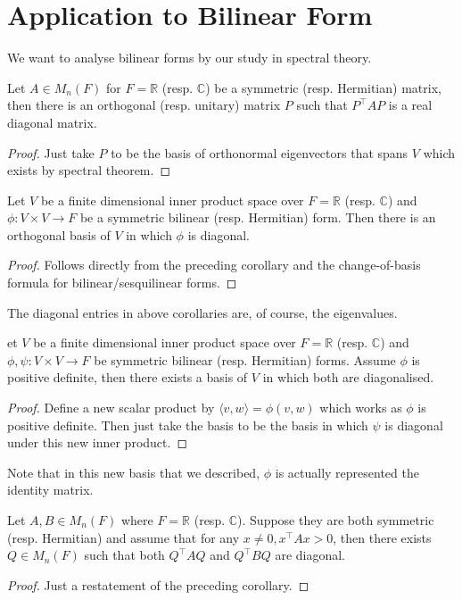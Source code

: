 \section{Application to Bilinear Form}
We want to analyse bilinear forms by our study in spectral theory.
\begin{corollary}
    Let $A\in M_n(F)$ for $F=\mathbb R$ (resp. $\mathbb C$) be a symmetric (resp. Hermitian) matrix, then there is an orthogonal (resp. unitary) matrix $P$ such that $P^\top AP$ is a real diagonal matrix.
\end{corollary}
\begin{proof}
    Just take $P$ to be the basis of orthonormal eigenvectors that spans $V$ which exists by spectral theorem.
\end{proof}
\begin{corollary}
    Let $V$ be a finite dimensional inner product space over $F=\mathbb R$ (resp. $\mathbb C$) and $\phi:V\times V\to F$ be a symmetric bilinear (resp. Hermitian) form.
    Then there is an orthogonal basis of $V$ in which $\phi$ is diagonal.
\end{corollary}
\begin{proof}
    Follows directly from the preceding corollary and the change-of-basis formula for bilinear/sesquilinear forms.
\end{proof}
\begin{remark}
    The diagonal entries in above corollaries are, of course, the eigenvalues.
\end{remark}
\begin{corollary}
    et $V$ be a finite dimensional inner product space over $F=\mathbb R$ (resp. $\mathbb C$) and $\phi,\psi:V\times V\to F$ be symmetric bilinear (resp. Hermitian) forms.
    Assume $\phi$ is positive definite, then there exists a basis of $V$ in which both are diagonalised.
\end{corollary}
\begin{proof}
    Define a new scalar product by $\langle v,w\rangle=\phi(v,w)$ which works as $\phi$ is positive definite.
    Then just take the basis to be the basis in which $\psi$ is diagonal under this new inner product.
\end{proof}
Note that in this new basis that we described, $\phi$ is actually represented the identity matrix.
\begin{corollary}
    Let $A,B\in M_n(F)$ where $F=\mathbb R$ (resp. $\mathbb C$).
    Suppose they are both symmetric (resp. Hermitian) and assume that for any $x\neq 0,x^\top Ax>0$, then there exists $Q\in M_n(F)$ such that both $Q^\top AQ$ and $Q^\top BQ$ are diagonal.
\end{corollary}
\begin{proof}
    Just a restatement of the preceding corollary.
\end{proof}